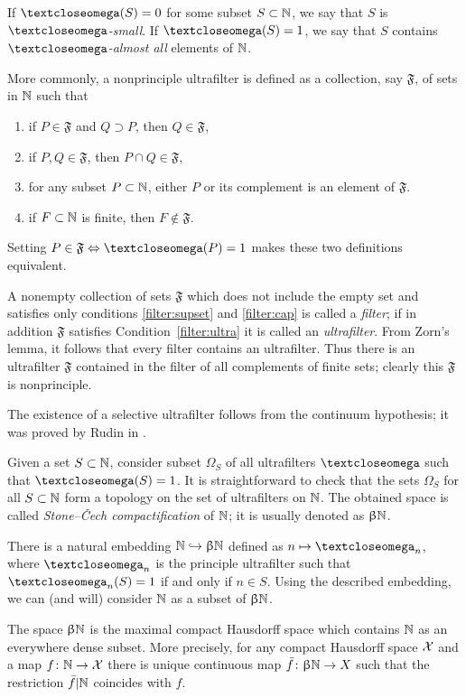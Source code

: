If $\o(S)=0$ for some subset $S\subset \NN$,
we say that $S$ is \emph{$\o$-small}. 
If $\o(S)=1$, we say that $S$ contains \emph{$\o$-almost all} elements of $\mathbb{N}$.

More commonly, a nonprinciple ultrafilter is defined as a collection, say $\mathfrak{F}$, of sets in $\mathbb{N}$ such that
\begin{enumerate}
\item\label{filter:supset} if $P\in \mathfrak{F}$ and $Q\supset P$, then $Q\in \mathfrak{F}$,
\item\label{filter:cap} if $P, Q\in \mathfrak{F}$, then $P\cap Q\in \mathfrak{F}$,
\item\label{filter:ultra} for any subset $P\subset\NN$, either $P$ or its complement is an element of $\mathfrak{F}$.
\item\label{filter:non-prin} if $F\subset \NN $ is finite, then $F\notin \mathfrak{F}$.
\end{enumerate}
Setting $P\in\mathfrak{F}\Leftrightarrow\o(P)=1$ makes these two definitions equivalent.

A nonempty collection of sets $\mathfrak{F}$ which does not include the empty set and satisfies only conditions \ref{filter:supset} and \ref{filter:cap} is called a \emph{filter}; 
if in addition $\mathfrak{F}$ satisfies Condition~\ref{filter:ultra} it is called an \emph{ultrafilter}.
From Zorn's lemma, it follows that every filter contains an ultrafilter.
Thus there is an ultrafilter $\mathfrak{F}$ contained in the filter of all complements of finite sets; clearly this $\mathfrak{F}$ is nonprinciple.

The existence of a selective ultrafilter follows from the continuum hypothesis;
it was proved by  Rudin in \cite{rudin}.

Given a set $S\subset \NN$, consider subset $\Omega_S$ of all ultrafilters $\o$ such that $\o(S)=1$.
It is straightforward to check that the sets $\Omega_S$ for all $S\subset \NN$ form a topology on the set of ultrafilters on $\mathbb{N}$. 
The obtained space is called \emph{Stone--\v{C}ech compactification} of $\mathbb{N}$;
it is usually denoted as $\upbeta\mathbb{N}$.

There is a natural embedding $\NN\hookrightarrow\beta\NN$ defined as
$n\mapsto\o_n$, where $\o_n$ is the principle ultrafilter such that $\o_n(S)=1$ if and only if $n\in S$. 
Using the described embedding, we can (and will) consider $\mathbb{N}$ as a subset of $\upbeta\mathbb{N}$.

The space $\upbeta\mathbb{N}$ is the maximal compact Hausdorff space which contains $\mathbb{N}$  as an everywhere dense subset.
More precisely, for any compact Hausdorff space $\mathcal{X}$ 
and a map $f\:\NN\to \spc{X}$ there is unique continuous map $\bar f\:\beta\NN\to X$ such that the restriction $\bar f|\mathbb{N}$ coincides with $f$. 

